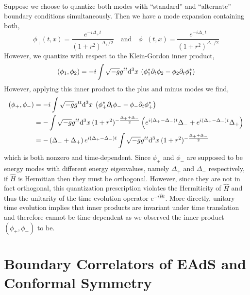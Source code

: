 \documentclass[12pt]{article}
\begin{document}
\subsection{}

Suppose we choose to quantize both modes with ``standard'' and ``alternate'' boundary conditions simultaneously. Then we have a mode expansion containing both,
\[ \phi_{+}(t,x) = \frac{e^{- i \Delta_{+} t}}{(1 + r^2)^{\Delta_{+}/2}} \quad \text{and} \quad \phi_{-}(t,x) = \frac{e^{- i \Delta_{-} t}}{(1 + r^2)^{\Delta_{-}/2}} \]
However, we quantize with respect to the Klein-Gordon inner product,
\[ (\phi_1, \phi_2) = - i \int \sqrt{-g} g^{tt} \mathrm{d}^{3} x \: \left( \phi_1^* \partial_t \phi_2 - \phi_2 \partial_t \phi_1^* \right) \]
However, applying this inner product to the plus and minus modes we find,
\begin{align*} 
(\phi_+, \phi_-) 
& = - i \int \sqrt{-g} g^{tt} \mathrm{d}^{3} x \: \left( \phi_{+}^* \partial_t \phi_{-} - \phi_{-} \partial_t \phi_{+}^* \right)
\\
& = - \int \sqrt{-g} g^{tt} \mathrm{d}^{3} x \: (1 + r^2)^{-\frac{\Delta_{+} + \Delta_{-}}{2}} \left( e^{i (\Delta_{+} - \Delta_{-} ) t} \Delta_{-} + e^{i (\Delta_{+} - \Delta_{-} ) t} \Delta_{+} \right)
\\
& = - \left(  \Delta_{-} +  \Delta_{+} \right) e^{i (\Delta_{+} - \Delta_{-} ) t} \int \sqrt{-g} g^{tt} \mathrm{d}^{3} x \: (1 + r^2)^{-\frac{\Delta_{+} + \Delta_{-}}{2}} 
\end{align*}
which is both nonzero and time-dependent. Since $\phi_{+}$ and $\phi_{-}$ are supposed to be energy modes with different energy eigenvalues, namely $\Delta_{+}$ and $\Delta_{-}$ respectively, if $\hat{H}$ is Hermitian then they must be orthogonal. However, since they are not in fact orthogonal, this quantization prescription violates the Hermiticity of $\hat{H}$ and thus the unitarity of the time evolution operator $e^{- i \hat{H} t}$. More directly, unitary time evolution implies that inner products are invariant under time translation and therefore cannot be time-dependent as we observed the inner product $(\phi_+, \phi_-)$ to be. 

\section{Boundary Correlators of EAdS and Conformal Symmetry}

\subsection{}
\end{document}
